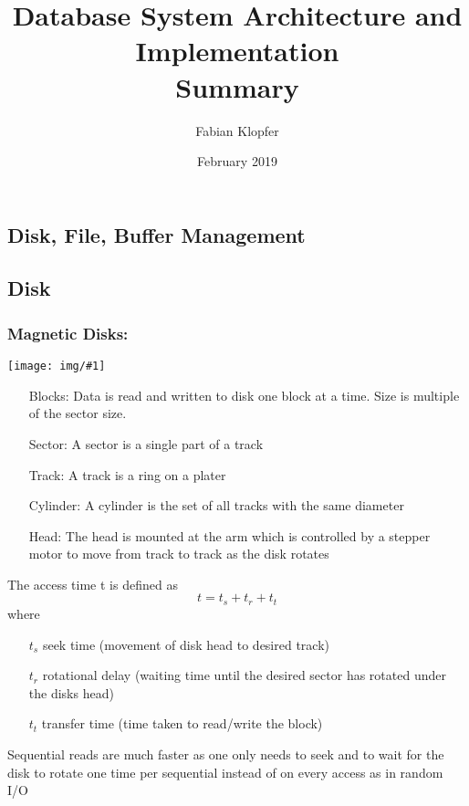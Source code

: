 \documentclass[a4paper]{article}
\title{Database System Architecture and Implementation \\
Summary}
\author{Fabian Klopfer}
\date{February 2019}
\newcommand{\img}[1]{\begin{center}
    \texttt{[image: img/\#1]}
\end{center} }
\begin{document}
\tableofcontents

\begin{twocolumn}
\section{Disk, File, Buffer Management}
\subsection{Disk}
\subsubsection{Magnetic Disks:}
\img{magnetic_disk.png}
\begin{enumerate}
	\item[Blocks:] Data is read and written to disk one block at a time. Size is multiple of the sector size.
	\item[Sector:] A sector is a single part of a track
	\item[Track:] A track is a ring on a plater
	\item[Cylinder:] A cylinder is the set of all tracks with the same diameter
	\item[Head:] The head is mounted at the arm which is controlled by a stepper motor to move from track to track as the disk rotates
\end{enumerate}
The access time t is defined as \[ t = t_s + t_r + t_t \]
where \begin{itemize}
	\item[$t_s$] seek time (movement of disk head to desired track)
	\item[$t_r$] rotational delay (waiting time until the desired sector has rotated under the disks head)
	\item[$t_t$] transfer time (time taken to read/write the block) 
\end{itemize}
Sequential reads are much faster as one only needs to seek and to wait for the disk to rotate one time per sequential instead of on every access as in random I/O \\


\end{twocolumn}
\end{document}
